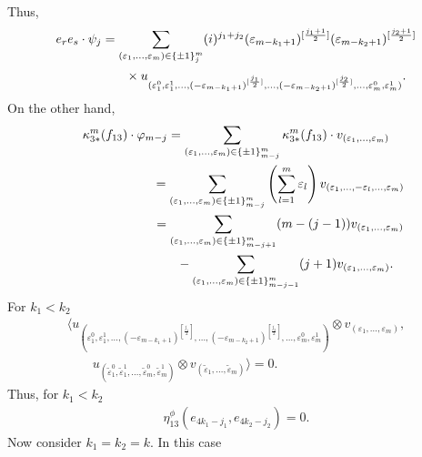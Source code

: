 \documentclass[10pt,a4paper]{amsart}
\numberwithin{equation}{section}
\begin{document}
Thus,
\begin{gather*}
 e_re_s\cdot\psi_{j}=
\sum_{(\varepsilon_{1},\dots ,\varepsilon_{m})\in\{\pm
1\}_{j}^{m}}(i)^{j_1+j_2}(\varepsilon_{m-k_1+1})^{[\frac{j_1+1}{2}]}(\varepsilon_{m-k_2+1})^{[\frac{j_2+1}{2}]}\\
\hphantom{e_re_s\cdot\psi_{j}=}{} \times u_{(\varepsilon_{1}^0, \varepsilon_{1}^1 ,\dots, (-\varepsilon_{m-k_1+1})^{[\frac{j_1}{2}]}, \dots,
(-\varepsilon_{m-k_2+1})^{[\frac{j_2}{2}]}, \dots,\varepsilon_{m}^0,\varepsilon_{m}^1)}.
\end{gather*}
On the other hand,
\begin{gather*}
\kappa_{3\ast}^{m}(f_{13})\cdot \varphi_{m-j} = \sum_{(\varepsilon_{1},\dots ,\varepsilon_{m})\in\{\pm1\}_{m-j}^{m}}\kappa_{3\ast}^{m}(f_{13})\cdot v_{(\varepsilon_{1},\dots,\varepsilon_m)}\\
\hphantom{\kappa_{3\ast}^{m}(f_{13})\cdot \varphi_{m-j}}{} =
 \sum_{(\varepsilon_{1},\dots,
\varepsilon_{m})\in\{\pm 1\}_{m-j}^{m}}\left( \sum_{l=1}^{m}\varepsilon_{l}\right)
v_{(\varepsilon_{1},\dots,-\varepsilon_{l},\dots,\varepsilon_m)}\\
\hphantom{\kappa_{3\ast}^{m}(f_{13})\cdot \varphi_{m-j}}{}
= \sum_{(\varepsilon_{1},\dots ,\varepsilon_{m})\in\{\pm
1\}_{m-j+1}^{m}}(m-(j-1))v_{(\varepsilon_{1},\dots,\varepsilon_m)}\\
\hphantom{\kappa_{3\ast}^{m}(f_{13})\cdot \varphi_{m-j}=}{}
-\sum_{(\varepsilon_{1},\dots, \varepsilon_{m})\in\{\pm 1\}_{m-j-1}^{m}}(j+1)v_{(\varepsilon_{1},\dots,\varepsilon_m)}.
\end{gather*}
For $k_1<k_2$
\begin{gather*}
\big\langle u_{(\varepsilon_{1}^0, \varepsilon_{1}^1, \dots, (-\varepsilon_{m-k_1+1})^{[\frac{j_1}{2}]} ,\dots,
(-\varepsilon_{m-k_2+1})^{[\frac{j_2}{2}]}, \dots, \varepsilon_{m}^0,\varepsilon_{m}^1)} \otimes v_{(\varepsilon_{1},\dots,\varepsilon_m)},\\
\qquad{} u_{(\tilde{\varepsilon}_{1}^0, \tilde{\varepsilon}_{1}^1, \dots ,\tilde{\varepsilon}_{m}^0,\tilde{\varepsilon}_{m}^1)} \otimes
v_{(\tilde{\varepsilon}_{1},\dots,\tilde{\varepsilon}_m)}\big\rangle =0.
\end{gather*}
Thus, for $k_1<k_2$
\begin{gather*}\eta_{13}^\phi(e_{4k_1-j_1},e_{4k_2-j_2})=0.\end{gather*}
Now consider $k_1=k_2=k$. In this case
\end{document}
